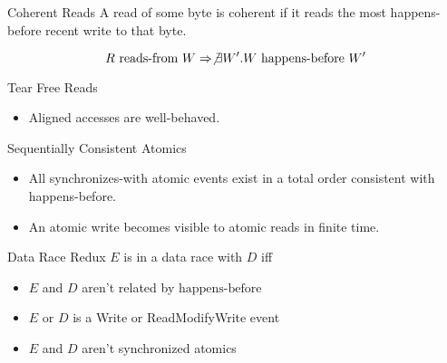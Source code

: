 \documentclass{beamer}
\begin{document}
\begin{frame}{Coherent Reads}
  A read of some byte is coherent if it reads the most happens-before recent write to that byte.

  $$
  R\ \textrm{reads-from}\ W \Rightarrow \not\exists W'. W\ \textrm{happens-before}\ W'
  $$

\end{frame}

\begin{frame}{Tear Free Reads}
  \begin{itemize}
  \item Aligned accesses are well-behaved.
  \end{itemize}

\end{frame}

\begin{frame}{Sequentially Consistent Atomics}
  \begin{itemize}
  \item All synchronizes-with atomic events exist in a total order consistent with happens-before.
  \item An atomic write becomes visible to atomic reads in finite time.
  \end{itemize}

\end{frame}

\begin{frame}{Data Race Redux}
  $E$ is in a data race with $D$ iff

  \begin{itemize}
  \item $E$ and $D$ aren't related by $\textrm{happens-before}$
  \item $E$ or $D$ is a Write or ReadModifyWrite event
  \item $E$ and $D$ aren't synchronized atomics
  \end{itemize}

\end{frame}
\end{document}
